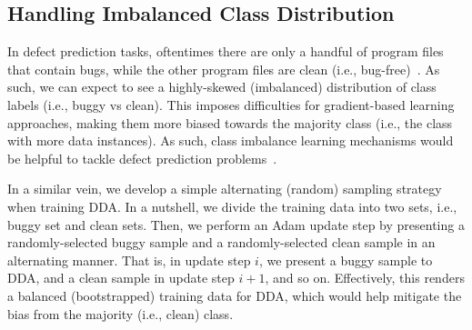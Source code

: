 

\subsection{Handling Imbalanced Class Distribution}
\label{sec:imbalanced}
In defect prediction tasks, oftentimes there are only a handful of program files that contain bugs, while the other program files are clean (i.e., bug-free)~\cite{khoshgoftaar2010attribute}. As such, we can expect to see a highly-skewed (imbalanced) distribution of class labels (i.e., buggy vs clean). This imposes difficulties for gradient-based learning approaches, making them more biased towards the majority class (i.e., the class with more data instances). As such, class imbalance learning mechanisms would be helpful to tackle defect prediction problems~\cite{wang2013using}. 

In a similar vein, we develop a simple alternating (random) sampling strategy \cite{Le2015} when training DDA. In a nutshell, we divide the training data into two sets, i.e., buggy set and clean sets. Then, we perform an Adam update step by presenting a randomly-selected buggy sample and a randomly-selected clean sample in an alternating manner. That is, in update step $i$, we present a buggy sample to DDA, and a clean sample in update step $i+1$, and so on. Effectively, this renders a balanced (bootstrapped) training data for DDA, which would help mitigate the bias from the majority (i.e., clean) class. 

